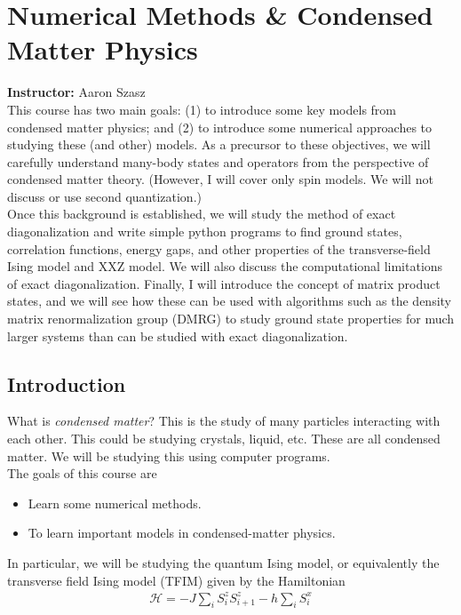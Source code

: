 \documentclass{book}
\theoremstyle{definition}
\newcommand{\had}{\mathcal{H}}
\begin{document}
\newpage
\chapter{Numerical Methods \& Condensed Matter Physics}

\textbf{Instructor:} Aaron Szasz\\

This course has two main goals: (1) to introduce some key models from condensed matter physics; and (2) to introduce some numerical approaches to studying these (and other) models.  As a precursor to these objectives, we will carefully understand many-body states and operators from the perspective of condensed matter theory.  (However, I will cover only spin models.  We will not discuss or use second quantization.)\\



Once this background is established, we will study the method of exact diagonalization and write simple python programs to find ground states, correlation functions, energy gaps, and other properties of the transverse-field Ising model and XXZ model.  We will also discuss the computational limitations of exact diagonalization.  Finally, I will introduce the concept of matrix product states, and we will see how these can be used with algorithms such as the density matrix renormalization group (DMRG) to study ground state properties for much larger systems than can be studied with exact diagonalization.


\section{Introduction}

What is \textit{condensed matter}? This is the study of many particles interacting with each other. This could be studying crystals, liquid, etc. These are all condensed matter. We will be studying this using computer programs. \\

The goals of this course are
\begin{itemize}
	\item Learn some numerical methods.
	\item To learn important models in condensed-matter physics.  
\end{itemize}

In particular, we will be studying the quantum Ising model, or equivalently the transverse field Ising model (TFIM) given by the Hamiltonian
\begin{align}
\had = -J \sum_i S^z_i S^z_{i+1} - h \sum_i S^x_i
\end{align}
\end{document}
